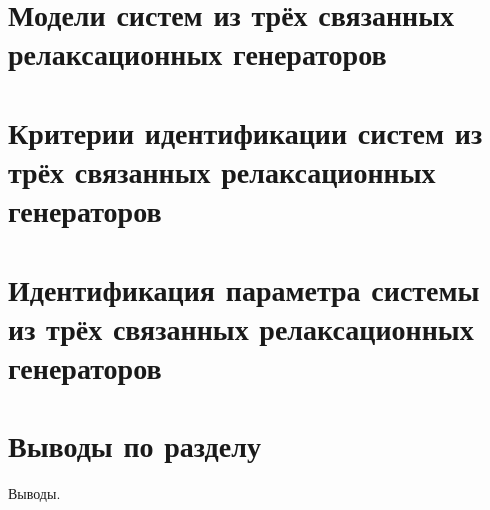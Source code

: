 \section{Модели систем из трёх связанных релаксационных генераторов}


\section{Критерии идентификации систем из трёх связанных релаксационных генераторов}

\section{Идентификация параметра системы из трёх связанных релаксационных генераторов}

\section{Выводы по разделу \thechapter}

Выводы.

